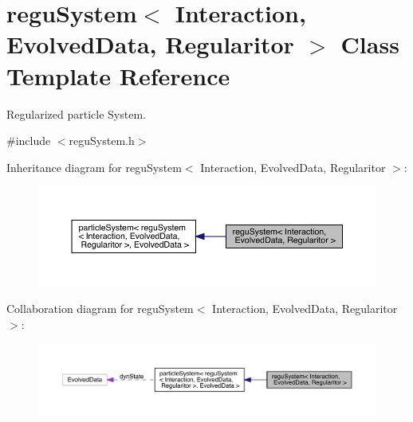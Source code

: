 \hypertarget{classregu_system}{}\section{regu\+System$<$ Interaction, Evolved\+Data, Regularitor $>$ Class Template Reference}
\label{classregu_system}


Regularized particle System.  




{\ttfamily \#include $<$regu\+System.\+h$>$}



Inheritance diagram for regu\+System$<$ Interaction, Evolved\+Data, Regularitor $>$\+:\nopagebreak
\begin{figure}[H]
\begin{center}
\leavevmode
\includegraphics[width=350pt]{classregu_system__inherit__graph}
\end{center}
\end{figure}


Collaboration diagram for regu\+System$<$ Interaction, Evolved\+Data, Regularitor $>$\+:\nopagebreak
\begin{figure}[H]
\begin{center}
\leavevmode
\includegraphics[width=350pt]{classregu_system__coll__graph}
\end{center}
\end{figure}
